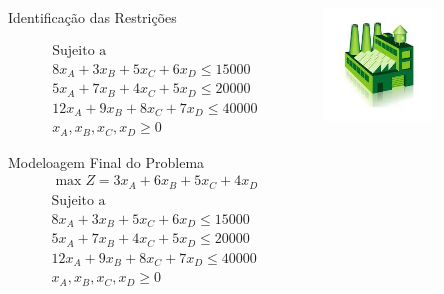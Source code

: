 \documentclass{beamer}
\begin{document}
\begin{frame}
\begin{columns}
\begin{column}{0.7\textwidth}
{\begin{block}{Identificação das Restrições}
{\begin{table}
						\end{table}
					}
					{
						\begin{equation*}
							\begin{matrix}
								\text{Sujeito a} \\
								8x_A + 3x_B + 5x_C + 6x_D \le 15000 \\
								5x_A + 7x_B + 4x_C + 5x_D \le 20000 \\
								12x_A + 9x_B + 8x_C + 7x_D \le 40000 \\
								x_A, x_B, x_C, x_D \ge 0		
							\end{matrix}
						\end{equation*}
					}
				\end{block}
			}		
			{
				\begin{block}{Modeloagem Final do Problema}
					\begin{equation*}
						\begin{matrix}
							\max Z = 3x_A + 6x_B + 5x_C + 4x_D \\
							\text{Sujeito a} \\
							8x_A + 3x_B + 5x_C + 6x_D \le 15000 \\
							5x_A + 7x_B + 4x_C + 5x_D \le 20000 \\
							12x_A + 9x_B + 8x_C + 7x_D \le 40000 \\
							x_A, x_B, x_C, x_D \ge 0		
						\end{matrix}
					\end{equation*}
				\end{block}
			}		
		\end{column}
		\begin{column}{0.3\textwidth}
				\centering
				\includegraphics[width=3cm,height=3cm]{industria.jpg}
		\end{column}
	\end{columns}
\end{frame}
\end{document}
